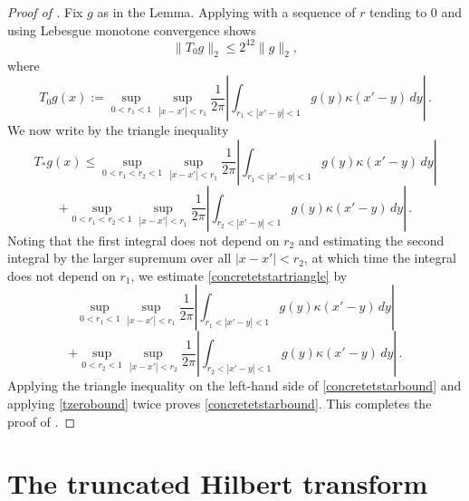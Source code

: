 \begin{proof}[Proof of ]
Fix $g$ as in the Lemma.
Applying  with a
sequence of $r$ tending to $0$ and using Lebesgue monotone convergence shows
\begin{equation}\label{tzerobound}
    \|T_{0}g\|_2\le 2^{42}\|g\|_2,
\end{equation}
where
\begin{equation}\label{eq-simpler--nontangential}
    T_{0} g(x):=\sup_{0<r_1<1}\sup_{|x-x'|<r_1}\frac 1{2\pi} \left|\int_{r_1<|x'-y|<1}
g(y) \kappa(x'-y)\, dy\right|\, .
\end{equation}
We now write by the triangle inequality
\begin{equation}\label{concretetstartriangle}
    T_* g(x)\le \sup_{0<r_1<r_2<1}\sup_{|x-x'|<r_1}\frac 1{2\pi} \left|\int_{r_1<|x'-y|<1}g(y) \kappa(x'-y)\, dy\right|
\end{equation}
    \begin{equation*}
+\sup_{0<r_1< r_2<1}\sup_{|x-x'|<r_1}\frac 1{2\pi} \left|\int_{r_2<|x'-y|<1} g(y) \kappa(x'-y)\, dy\right|\, .
\end{equation*}
Noting that the first integral does not depend on $r_2$ and
estimating the second integral by the larger supremum over all
$|x-x'|<r_2$, at which time the integral does not depend on $r_1$, we estimate \eqref{concretetstartriangle} by
\begin{equation}\label{concretetstartriangle2}
   \sup_{0<r_1<1}\sup_{|x-x'|<r_1}\frac 1{2\pi} \left|\int_{r_1<|x'-y|<1}g(y) \kappa(x'-y)\, dy\right|
\end{equation}
    \begin{equation*}
+\sup_{0< r_2<1}\sup_{|x-x'|<r_2}\frac 1{2\pi} \left|\int_{r_2<|x'-y|<1} g(y) \kappa(x'-y)\, dy\right|\, .
\end{equation*}
    Applying the triangle inequality on the left-hand side
    of \eqref{concretetstarbound} and applying
     \eqref{tzerobound} twice
    proves \eqref{concretetstarbound}.
    This completes the proof of .
\end{proof}





\section{The truncated Hilbert transform}
\label{10hilbert}





